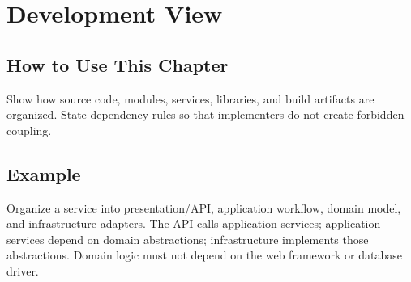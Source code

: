 \chapter{Development View}
\section{How to Use This Chapter}
Show how source code, modules, services, libraries, and build artifacts are organized. State dependency rules so that implementers do not create forbidden coupling.
\section{Example}
Organize a service into presentation/API, application workflow, domain model, and infrastructure adapters. The API calls application services; application services depend on domain abstractions; infrastructure implements those abstractions. Domain logic must not depend on the web framework or database driver.
